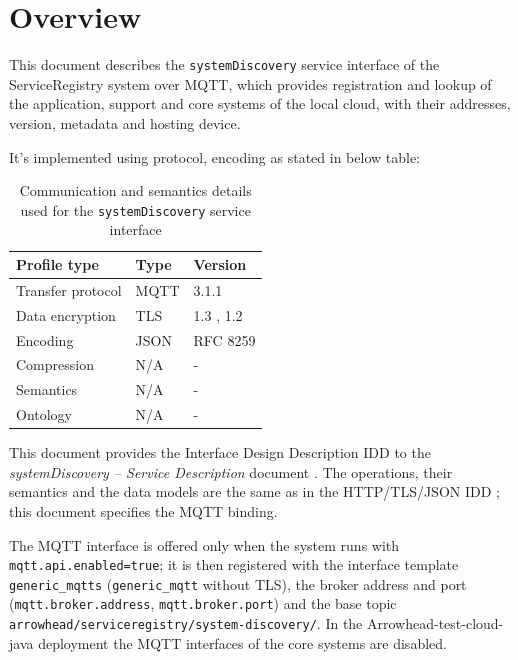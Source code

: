 \documentclass[a4paper]{arrowhead}
\begin{document}
\section{Overview}
\label{sec:overview}

This document describes the \texttt{systemDiscovery} service interface of the ServiceRegistry system over MQTT, which provides registration and lookup of the application, support and core systems of the local cloud, with their addresses, version, metadata and hosting device.

It's implemented using protocol, encoding as stated in below table:
\begin{table}[ht!]
  \centering
  \begin{tabular}{|l|l|l|}
    \hline
    \rowcolor{gray!33} Profile type & Type & Version \\ \hline
    Transfer protocol & MQTT & 3.1.1 \cite{mqtt311} \\ \hline
    Data encryption & TLS & 1.3 \cite{rfc8446}, 1.2 \cite{rfc5246} \\ \hline
    Encoding & JSON & RFC 8259 \cite{rfc8259} \\ \hline
    Compression & N/A & - \\ \hline
    Semantics & N/A & - \\ \hline
    Ontology & N/A & - \\ \hline
  \end{tabular}
  \caption{Communication and semantics details used for the \texttt{systemDiscovery} service interface}
  \label{tab:comunication_semantics_profile}
\end{table}

This document provides the Interface Design Description IDD to the \textit{systemDiscovery -- Service Description} document \cite{sr-systemDiscovery-sd}.
The operations, their semantics and the data models are the same as in the HTTP/TLS/JSON IDD \cite{sr-systemDiscovery-http-idd}; this document specifies the MQTT binding.

The MQTT interface is offered only when the system runs with \texttt{mqtt.api.enabled=true}; it is then registered with the interface template \texttt{generic\_\allowbreak{}mqtts} (\texttt{generic\_\allowbreak{}mqtt} without TLS), the broker address and port (\texttt{mqtt.\allowbreak{}broker.\allowbreak{}address}, \texttt{mqtt.\allowbreak{}broker.\allowbreak{}port}) and the base topic \texttt{arrowhead/\allowbreak{}serviceregistry/\allowbreak{}system-\allowbreak{}discovery/\allowbreak{}}. In the Arrowhead-test-cloud-java deployment the MQTT interfaces of the core systems are disabled.
\end{document}
